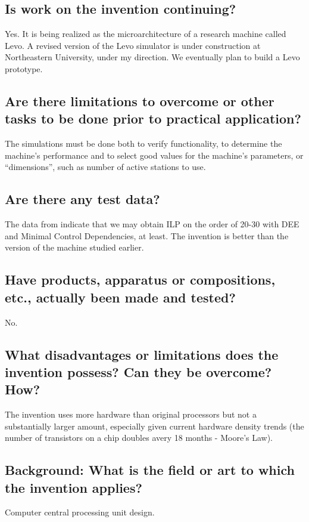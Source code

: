 \documentclass[10pt,dvips]{article}
\begin{document}
\subsection{Is work on the invention continuing?}
Yes. It is being realized as the microarchitecture of a research machine called Levo.
A revised version of the Levo simulator is under construction at Northeastern
University, under my direction. We eventually plan to build a Levo prototype.

\subsection{Are there limitations to overcome or other tasks to be done prior to
practical application?}
The simulations must be done both to verify functionality, to determine the machine's
performance and to select good values for the machine's parameters, or ``dimensions'',
such as number of active stations to use.

\subsection{Are there any test data?}
The data from \cite{Uht95} indicate that we may obtain ILP on the order of 20-30
with DEE and Minimal Control Dependencies,
at least. The invention is better than the version of the machine studied earlier.

\subsection{Have products, apparatus or compositions, etc., actually been made and tested?}
No.

\subsection{What disadvantages or limitations does the invention possess?
Can they be overcome? How?}
The invention uses more hardware than original processors
but not a substantially larger amount, especially
given current hardware density trends (the number of transistors on a chip doubles
avery 18 months - Moore's Law). 

\subsection{Background: What is the field or art to which the invention applies?}
Computer central processing unit design.
\end{document}
